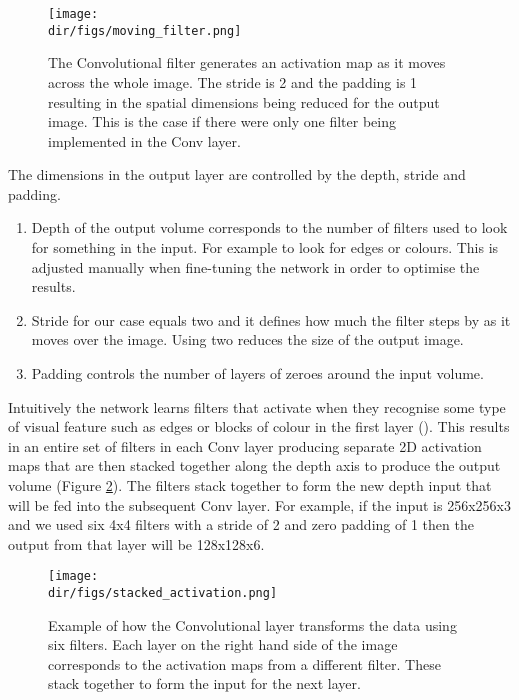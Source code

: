 \begin{figure}[htbp]
    \centering
    \texttt{[image: \\dir/figs/moving\_filter.png]}
    \caption[Example of one Convolutional filter]{The Convolutional filter generates an activation map as it moves across the whole image. The stride is 2 and the padding is 1 resulting in the spatial dimensions being reduced for the output image. This is the case if there were only one filter being implemented in the Conv layer.}
    \label{fig.moving_filter}
\end{figure}
The dimensions in the output layer are controlled by the depth, stride and padding. 
\begin{enumerate}
    \item Depth of the output volume corresponds to the number of filters used to look for something in the input. For example to look for edges or colours. This is adjusted manually when fine-tuning the network in order to optimise the results.
    \item Stride for our case equals two and it defines how much the filter steps by as it moves over the image. Using two reduces the size of the output image.
    \item Padding controls the number of layers of zeroes around the input volume. 
\end{enumerate}
Intuitively the network learns filters that activate when they recognise some type of visual feature such as edges or blocks of colour in the first layer (\cite{karpathy_cnn1}). This results in an entire set of filters in each Conv layer producing separate 2D activation maps that are then stacked together along the depth axis to produce the output volume (Figure \ref{fig.conv_filter}). The filters stack together to form the new depth input that will be fed into the subsequent Conv layer. For example, if the input is 256x256x3 and we used six 4x4 filters with a stride of 2 and zero padding of 1 then the output from that layer will be 128x128x6. 

\begin{figure}[htbp]
    \centering
    \texttt{[image: \\dir/figs/stacked\_activation.png]}
    \caption[Example of how the Convolutional layer transforms the data using six filters]{Example of how the Convolutional layer transforms the data using six filters. Each layer on the right hand side of the image corresponds to the activation maps from a different filter. These stack together to form the input for the next layer.}
    \label{fig.conv_filter}
\end{figure}

